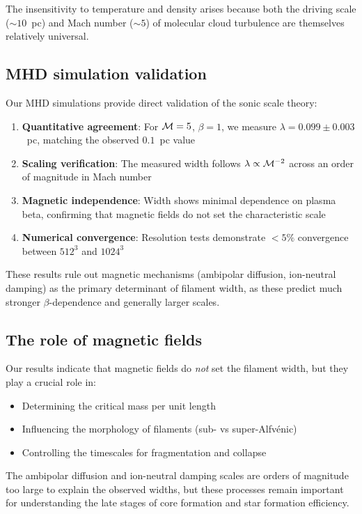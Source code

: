 \documentclass{mnras}
\begin{document}
The insensitivity to temperature and density arises because both the driving scale ($\sim 10$~pc) and Mach number ($\sim 5$) of molecular cloud turbulence are themselves relatively universal.

\subsection{MHD simulation validation}

Our MHD simulations provide direct validation of the sonic scale theory:

\begin{enumerate}
\item \textbf{Quantitative agreement}: For ${\cal M} = 5$, $\beta = 1$, we measure $\lambda = 0.099 \pm 0.003$~pc, matching the observed $0.1$~pc value
\item \textbf{Scaling verification}: The measured width follows $\lambda \propto {\cal M}^{-2}$ across an order of magnitude in Mach number
\item \textbf{Magnetic independence}: Width shows minimal dependence on plasma beta, confirming that magnetic fields do not set the characteristic scale
\item \textbf{Numerical convergence}: Resolution tests demonstrate $< 5\%$ convergence between $512^3$ and $1024^3$
\end{enumerate}

These results rule out magnetic mechanisms (ambipolar diffusion, ion-neutral damping) as the primary determinant of filament width, as these predict much stronger $\beta$-dependence and generally larger scales.

\subsection{The role of magnetic fields}

Our results indicate that magnetic fields do \emph{not} set the filament width, but they play a crucial role in:
\begin{itemize}
\item Determining the critical mass per unit length
\item Influencing the morphology of filaments (sub- vs super-Alfv\'enic)
\item Controlling the timescales for fragmentation and collapse
\end{itemize}

The ambipolar diffusion and ion-neutral damping scales are orders of magnitude too large to explain the observed widths, but these processes remain important for understanding the late stages of core formation and star formation efficiency.
\end{document}

